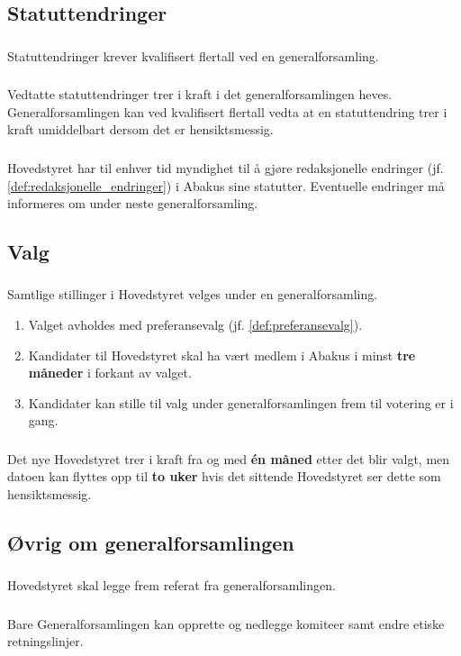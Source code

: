 \subsection{Statuttendringer}
\subsubsection{}
Statuttendringer krever kvalifisert flertall ved en generalforsamling.

\subsubsection{}
Vedtatte statuttendringer trer i kraft i det generalforsamlingen heves. Generalforsamlingen kan ved kvalifisert
 flertall vedta at en statuttendring trer i kraft umiddelbart dersom det er hensiktsmessig.

\subsubsection{}
Hovedstyret har til enhver tid myndighet til å gjøre redaksjonelle endringer (jf. \ref{def:redaksjonelle_endringer}) i
 Abakus sine statutter. Eventuelle endringer må informeres om under neste generalforsamling.

\subsection{Valg}
\subsubsection{}\label{subsec:genfors_valg}
Samtlige stillinger i Hovedstyret velges under en generalforsamling.
\begin{enumerate}[label=\alph*)]
    \item Valget avholdes med preferansevalg (jf. \ref{def:preferansevalg}).
    \item Kandidater til Hovedstyret skal ha vært medlem i Abakus i minst \textbf{tre måneder} i forkant av valget.
    \item Kandidater kan stille til valg under generalforsamlingen frem til votering er i gang.
\end{enumerate}

\subsubsection{}
Det nye Hovedstyret trer i kraft fra og med \textbf{én måned} etter det blir valgt, men datoen kan
flyttes opp til \textbf{to uker} hvis det sittende Hovedstyret ser dette som hensiktsmessig.

\subsection{Øvrig om generalforsamlingen}
\subsubsection{}
Hovedstyret skal legge frem referat fra generalforsamlingen.

\subsubsection{}
Bare Generalforsamlingen kan opprette og nedlegge komiteer samt endre etiske retningslinjer.
